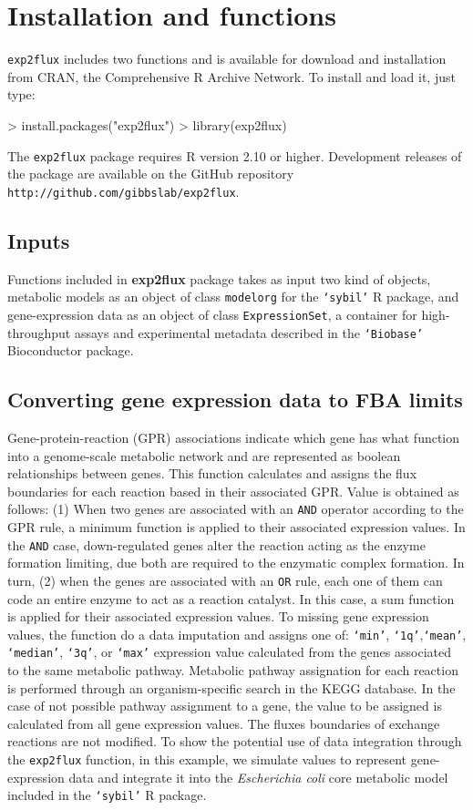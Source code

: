 \section{Installation and functions}
\texttt{exp2flux} includes two functions and is available for download and installation from CRAN, the
Comprehensive R Archive Network. To install and load it, just type:
\begin{Schunk}
\begin{Sinput}
> install.packages("exp2flux")
> library(exp2flux)
\end{Sinput}
\end{Schunk}
The \texttt{exp2flux} package requires R version 2.10 or higher. Development releases of the package are available on the GitHub repository \texttt{http://github.com/gibbslab/exp2flux}.
\subsection*{Inputs}
Functions included in \textbf{exp2flux} package takes as input two kind of objects, metabolic models as an object of class \texttt{modelorg} for the \texttt{`sybil'} R package, and gene-expression data as an object of class \texttt{ExpressionSet}, a container for high-throughput assays and experimental metadata described in the \texttt{`Biobase'} Bioconductor package. 
\subsection*{Converting gene expression data to FBA limits}
Gene-protein-reaction (GPR) associations indicate which gene has what function into a genome-scale metabolic network and are represented as boolean relationships between genes. This function calculates and assigns the flux boundaries for each reaction based in their associated GPR. Value is obtained as follows: (1) When two genes are associated with an \texttt{AND} operator according to the GPR rule, a minimum function is applied to their associated expression values. In the \texttt{AND} case, down-regulated genes alter the reaction acting as the enzyme formation limiting, due both are required to the enzymatic complex formation. In turn, (2) when the genes are associated with an \texttt{OR} rule, each one of them can code an entire enzyme to act as a reaction catalyst. In this case, a sum function is applied for their associated expression values.  To missing gene expression values, the function do a data imputation and assigns one of: \texttt{`min'}, \texttt{`1q'},\texttt{`mean'}, \texttt{`median'}, \texttt{`3q'}, or \texttt{`max'} expression value calculated from the genes associated to the same metabolic pathway. Metabolic pathway assignation for each reaction is performed through an organism-specific search in the KEGG database. In the case of not possible pathway assignment to a gene, the value to be assigned is calculated from all gene expression values. The fluxes boundaries of exchange reactions are not modified.
To show the potential use of data integration through the \texttt{exp2flux} function, in this example, we simulate values to represent gene-expression data and integrate it into the \emph{Escherichia coli} core metabolic model included in the \texttt{`sybil'} R package. \\


